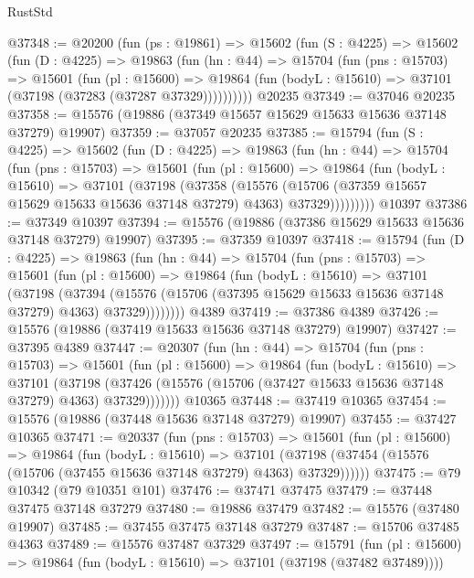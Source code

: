 \begin{lexlean}{RustStd}
\begin{coremodule}
@37348 := @20200
    (fun (ps : @19861) =>
    @15602
      (fun (S : @4225) =>
      @15602
        (fun (D : @4225) =>
        @19863
          (fun (hn : @44) =>
          @15704
            (fun (pns : @15703) =>
            @15601
              (fun (pl : @15600) =>
              @19864 (fun (bodyL : @15610) => @37101 (@37198 (@37283 (@37287 @37329))))))))))
    @20235
@37349 := @37046 @20235
@37358 := @15576 (@19886 (@37349 @15657 @15629 @15633 @15636 @37148 @37279) @19907)
@37359 := @37057 @20235
@37385 := @15794
    (fun (S : @4225) =>
    @15602
      (fun (D : @4225) =>
      @19863
        (fun (hn : @44) =>
        @15704
          (fun (pns : @15703) =>
          @15601
            (fun (pl : @15600) =>
            @19864
              (fun (bodyL : @15610) =>
              @37101
                (@37198
                  (@37358
                    (@15576
                      (@15706 (@37359 @15657 @15629 @15633 @15636 @37148 @37279) @4363)
                      @37329)))))))))
    @10397
@37386 := @37349 @10397
@37394 := @15576 (@19886 (@37386 @15629 @15633 @15636 @37148 @37279) @19907)
@37395 := @37359 @10397
@37418 := @15794
    (fun (D : @4225) =>
    @19863
      (fun (hn : @44) =>
      @15704
        (fun (pns : @15703) =>
        @15601
          (fun (pl : @15600) =>
          @19864
            (fun (bodyL : @15610) =>
            @37101
              (@37198
                (@37394
                  (@15576 (@15706 (@37395 @15629 @15633 @15636 @37148 @37279) @4363) @37329))))))))
    @4389
@37419 := @37386 @4389
@37426 := @15576 (@19886 (@37419 @15633 @15636 @37148 @37279) @19907)
@37427 := @37395 @4389
@37447 := @20307
    (fun (hn : @44) =>
    @15704
      (fun (pns : @15703) =>
      @15601
        (fun (pl : @15600) =>
        @19864
          (fun (bodyL : @15610) =>
          @37101
            (@37198
              (@37426 (@15576 (@15706 (@37427 @15633 @15636 @37148 @37279) @4363) @37329)))))))
    @10365
@37448 := @37419 @10365
@37454 := @15576 (@19886 (@37448 @15636 @37148 @37279) @19907)
@37455 := @37427 @10365
@37471 := @20337
    (fun (pns : @15703) =>
    @15601
      (fun (pl : @15600) =>
      @19864
        (fun (bodyL : @15610) =>
        @37101 (@37198 (@37454 (@15576 (@15706 (@37455 @15636 @37148 @37279) @4363) @37329))))))
@37475 := @79 @10342 (@79 @10351 @101)
@37476 := @37471 @37475
@37479 := @37448 @37475 @37148 @37279
@37480 := @19886 @37479
@37482 := @15576 (@37480 @19907)
@37485 := @37455 @37475 @37148 @37279
@37487 := @15706 @37485 @4363
@37489 := @15576 @37487 @37329
@37497 := @15791
    (fun (pl : @15600) => @19864 (fun (bodyL : @15610) => @37101 (@37198 (@37482 @37489))))

\end{coremodule}
\end{lexlean}
